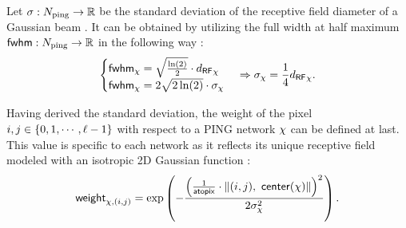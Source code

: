 Let $\sigma: N_{\mathrm{ping}} \to \mathbb{R}$ be the standard deviation of the receptive field diameter of a Gaussian beam . It can be obtained by utilizing the full width at half maximum $\mathsf{fwhm}: N_{\mathrm{ping}} \to \mathbb{R}$ in the following way \cite{MaryamPLACEHOLDER}:
\begin{equation}
    \begin{cases}
        \mathsf{fwhm}_\chi = \sqrt{\frac{\ln(2)}{2}} \cdot {d_\mathsf{RF}}_\chi \\
        \mathsf{fwhm}_\chi = 2 \sqrt{2 \ln(2)} \cdot \sigma_\chi
    \end{cases}
    \Rightarrow 
    \sigma_\chi = \frac{1}{4} {d_\mathsf{RF}}_\chi.
\end{equation}

Having derived the standard deviation, the weight of the pixel $i, j \in \{ 0, 1, \cdots, \ell - 1 \}$ with respect to a PING network $\chi$ can be defined at last. This value is specific to each network as it reflects its unique receptive field modeled with an isotropic 2D Gaussian function \cite{MaryamPLACEHOLDER}:
\begin{equation}
    \weight_{\pingnet, (i, j)} = \exp \left(
        -\frac{\left( \frac{1}{\atopix} \cdot \| (i, j), \ \centr(\pingnet) \|\right)^2}{ 2 \stdrf_\pingnet^2 }
    \right).
    \label{eq:weight-pixel-network}
\end{equation}